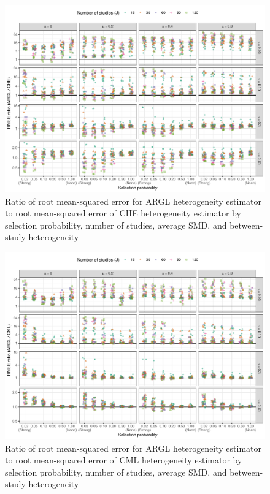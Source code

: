 \documentclass[
  american,
  man, donotrepeattitle,mask,floatsintext]{apa7}
\numberwithin{table}{section}
\numberwithin{equation}{section}
\numberwithin{figure}{section}
\begin{document}
\begin{figure}
\includegraphics{step-function-selection-models-supplementary-materials_files/figure-latex/heterogeneity-rmse-ARGL-CHE-1} \caption{Ratio of root mean-squared error for ARGL heterogeneity estimator to root mean-squared error of CHE heterogeneity estimator by selection probability, number of studies, average SMD, and between-study heterogeneity}\label{fig:heterogeneity-rmse-ARGL-CHE}
\end{figure}

\begin{figure}
\includegraphics{step-function-selection-models-supplementary-materials_files/figure-latex/heterogeneity-rmse-ARGL-CML-1} \caption{Ratio of root mean-squared error for ARGL heterogeneity estimator to root mean-squared error of CML heterogeneity estimator by selection probability, number of studies, average SMD, and between-study heterogeneity}\label{fig:heterogeneity-rmse-ARGL-CML}
\end{figure}
\end{document}
